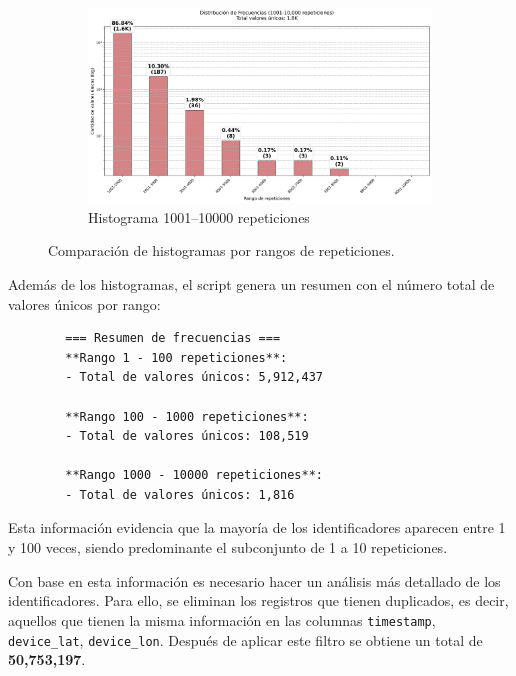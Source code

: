 \begin{figure}[htbp]
    \begin{subfigure}[t]{0.48\textwidth}
        \centering
        \includegraphics[width=\linewidth]{img/histograma_1k-10k_identifier_Mobility_Data_Slim.png}
        \caption{Histograma 1001–10000 repeticiones}
        \label{fig:sub3}
    \end{subfigure}

    \caption{Comparación de histogramas por rangos de repeticiones.}
    \label{fig:histogramas}
\end{figure}

Además de los histogramas, el script genera un resumen con el número total de valores únicos por rango:

\begin{verbatim}
        === Resumen de frecuencias ===
        **Rango 1 - 100 repeticiones**:
        - Total de valores únicos: 5,912,437

        **Rango 100 - 1000 repeticiones**:
        - Total de valores únicos: 108,519

        **Rango 1000 - 10000 repeticiones**:
        - Total de valores únicos: 1,816
\end{verbatim}

Esta información evidencia que la mayoría de los identificadores aparecen entre 1 y 100 veces, siendo predominante el subconjunto de 1 a 10 repeticiones. 

\newpage
Con base en esta información es necesario hacer un análisis más detallado de los identificadores. Para ello, se eliminan los registros que tienen duplicados, es decir, aquellos que tienen la misma información en las columnas \texttt{timestamp}, \texttt{device\_lat}, \texttt{device\_lon}. Después de aplicar este filtro se obtiene un total de \textbf{50,753,197}. 

